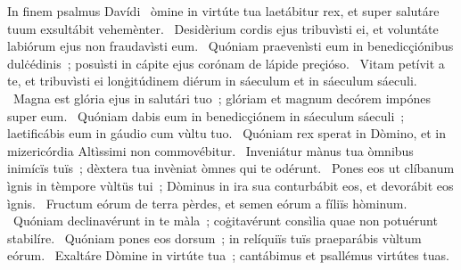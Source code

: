 { In finem psalmus Davídi}
{%
~òmine in virtúte tua laetábitur rex, et super salutáre tuum exsultábit vehemènter. 
~Desidèrium cordis ejus tribuvìsti ei, et voluntáte labiórum ejus non fraudavìsti eum. 
~Quóniam praevenìsti eum in benedicçiónibus dulċédinis~; posuìsti in cápite ejus corónam de lápide preçióso. 
~Vitam petívit a te, et tribuvìsti ei lonġitúdinem diérum in sáeculum et in sáeculum sáeculi. 
~Magna est glória ejus in salutári tuo~; glóriam et magnum decórem impónes super eum. 
~Quóniam dabis eum in benedicçiónem in sáeculum sáeculi~; laetificábis eum in gáudio cum vùltu tuo. 
~Quóniam rex sperat in Dòmino, et in mizericórdia Altìssimi non commovébitur. 
~Inveniátur mànus tua òmnibus inimícïs tuïs~; dèxtera tua invèniat òmnes qui te odérunt. 
~Pones eos ut clíbanum ìgnis in tèmpore vùltüs tui~; Dòminus in ira sua conturbábit eos, et devorábit eos ìgnis. 
~Fructum eórum de terra pèrdes, et semen eórum a fíliïs hòminum. 
~Quóniam declinavérunt in te màla~; coġitavérunt consìlia quae non potuérunt stabilíre. 
~Quóniam pones eos dorsum~; in relíquiïs tuïs praeparábis vùltum eórum. 
~Exaltáre Dòmine in virtúte tua~; cantábimus et psallémus virtútes tuas. 
}
